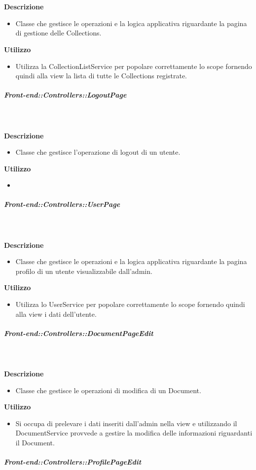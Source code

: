        \textbf{\\ \\ Descrizione} 
          \begin{itemize}
            \item[] Classe che gestisce le operazioni e la logica applicativa riguardante la pagina di gestione delle Collections.
          \end{itemize}      
        \textbf{Utilizzo}  
          \begin{itemize}
            \item[] Utilizza la CollectionListService per popolare correttamente lo scope fornendo quindi alla view la lista di tutte le Collections registrate.
          \end{itemize}
      \subparagraph{Front-end::Controllers::LogoutPage}
        
        \textbf{\\ \\ Descrizione} 
          \begin{itemize}
            \item[] Classe che gestisce l'operazione di logout di un utente.
          \end{itemize}      
        \textbf{Utilizzo}  
          \begin{itemize}
            \item[] 
          \end{itemize}
      \subparagraph{Front-end::Controllers::UserPage}
        
        \textbf{\\ \\ Descrizione} 
          \begin{itemize}
            \item[] Classe che gestisce le operazioni e la logica applicativa riguardante la pagina profilo di un utente visualizzabile dall'admin.
          \end{itemize}      
        \textbf{Utilizzo}  
          \begin{itemize}
            \item[] Utilizza lo UserService per popolare correttamente lo scope fornendo quindi alla view i dati dell'utente.
          \end{itemize}
      \subparagraph{Front-end::Controllers::DocumentPageEdit}
        
        \textbf{\\ \\ Descrizione} 
          \begin{itemize}
            \item[] Classe che gestisce le operazioni di modifica di un Document.
          \end{itemize}      
        \textbf{Utilizzo}  
          \begin{itemize}
            \item[] Si occupa di prelevare i dati inseriti dall'admin nella view e utilizzando il DocumentService provvede a gestire la modifica delle informazioni riguardanti il Document.
          \end{itemize}
      \subparagraph{Front-end::Controllers::ProfilePageEdit}
        
